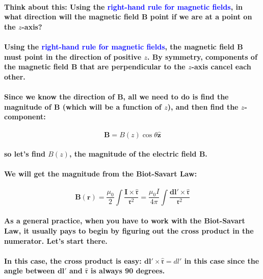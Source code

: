 \documentclass{article}
\begin{document}
\paragraph{Think about this: Using the \textcolor{blue}{right-hand rule for magnetic fields}, in what direction will the magnetic field $\boldsymbol{B}$ point if we are at a point on the $z$-axis?}
\paragraph{Using the \textcolor{blue}{right-hand rule for magnetic fields}, the magnetic field $\boldsymbol{B}$ must point in the direction of positive $z$. By symmetry, components of the magnetic field $\boldsymbol{B}$ that are perpendicular to the $z$-axis cancel each other.}
\paragraph{Since we know the direction of $\boldsymbol{B}$, all we need to do is find the magnitude of $\boldsymbol{B}$ (which will be a function of $z$), and then find the $z$-component:}
\begin{equation*}
    \boldsymbol{B}=B(z)\cos\theta\hat{\boldsymbol{z}}
\end{equation*}
\paragraph{so let's find $B(z)$, the magnitude of the electric field $\boldsymbol{B}$.}
\paragraph{We will get the magnitude from the Biot-Savart Law:}
\begin{equation*}
    \boldsymbol{B}(\boldsymbol{r})=\frac{\mu_0}{2}\int\frac{\boldsymbol{I}\times\hat{\boldsymbol{\mathfrak{r}}}}{\mathfrak{r}^2}=\frac{\mu_0I}{4\pi}\int\frac{\boldsymbol{dl'}\times\hat{\boldsymbol{\mathfrak{r}}}}{\mathfrak{r}^2}
\end{equation*}
\paragraph{As a general practice, when you have to work with the Biot-Savart Law, it usually pays to begin by figuring out the cross product in the numerator. Let's start there.}
\paragraph{In this case, the cross product is easy: $\boldsymbol{dl}'\times\hat{\boldsymbol{\mathfrak{r}}}=dl'$ in this case since the angle between $\boldsymbol{dl}'$ and $\hat{\boldsymbol{\mathfrak{r}}}$ is always 90 degrees.}
\end{document}
